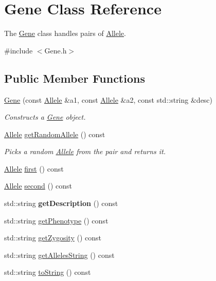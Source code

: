 \hypertarget{class_gene}{}\section{Gene Class Reference}
\label{class_gene}


The \hyperlink{class_gene}{Gene} class handles pairs of \hyperlink{class_allele}{Allele}.  




{\ttfamily \#include $<$Gene.\+h$>$}

\subsection*{Public Member Functions}
\begin{DoxyCompactItemize}
\item 
\hyperlink{class_gene_a3e8f531d014dd6aa2cfb25c7fed5ae5d}{Gene} (const \hyperlink{class_allele}{Allele} \&a1, const \hyperlink{class_allele}{Allele} \&a2, const std\+::string \&desc)
\begin{DoxyCompactList}\small\item\em Constructs a \hyperlink{class_gene}{Gene} object. \end{DoxyCompactList}\item 
\hyperlink{class_allele}{Allele} \hyperlink{class_gene_a7b631b7a53729db7523430049c89e463}{get\+Random\+Allele} () const 
\begin{DoxyCompactList}\small\item\em Picks a random \hyperlink{class_allele}{Allele} from the pair and returns it. \end{DoxyCompactList}\item 
\hyperlink{class_allele}{Allele} \hyperlink{class_gene_a935e5f290b1e66b970ed8b52a97b1ae9}{first} () const 
\item 
\hyperlink{class_allele}{Allele} \hyperlink{class_gene_a7c744b5c6e8d305c47c1563cc0e2acc8}{second} () const 
\item 
std\+::string {\bfseries get\+Description} () const \hypertarget{class_gene_ad25e29f23ead79aa820a6df83ce37f21}{}\label{class_gene_ad25e29f23ead79aa820a6df83ce37f21}

\item 
std\+::string \hyperlink{class_gene_a97e77e08f0ade2ebe413aab5a2160007}{get\+Phenotype} () const 
\item 
std\+::string \hyperlink{class_gene_a9b88c16c2408458ca43a82cdc4d5cbe3}{get\+Zygosity} () const 
\item 
std\+::string \hyperlink{class_gene_ab4b2614b4481851fcbd61860c464406f}{get\+Alleles\+String} () const 
\item 
std\+::string \hyperlink{class_gene_a3d5569b6329c23acf791ce310735fc5d}{to\+String} () const 
\end{DoxyCompactItemize}


